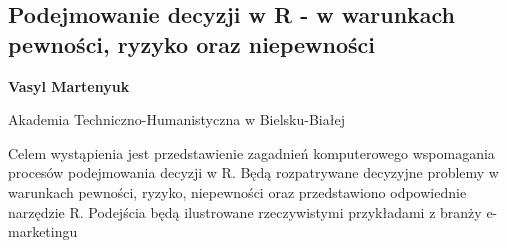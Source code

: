 \documentclass[\main/boa.tex]{subfiles}
\begin{document}
\subsection{Podejmowanie decyzji w R - w warunkach pewności, ryzyko oraz niepewności}

\begin{minipage}{0.915\textwidth}
	\centering
  {\bf {} Vasyl Martenyuk }
\end{minipage}



\begin{affiliations}
\begin{minipage}{0.915\textwidth}
\centering
Akademia Techniczno-Humanistyczna w Bielsku-Białej \\[-2pt]
\end{minipage}
\end{affiliations}

\vskip 0.3cm

Celem wystąpienia jest przedstawienie zagadnień komputerowego wspomagania procesów podejmowania decyzji w R. Będą rozpatrywane decyzyjne problemy w warunkach pewności, ryzyko, niepewności oraz przedstawiono odpowiednie narzędzie R. Podejścia będą ilustrowane rzeczywistymi przykładami z branży e-marketingu
\end{document}
